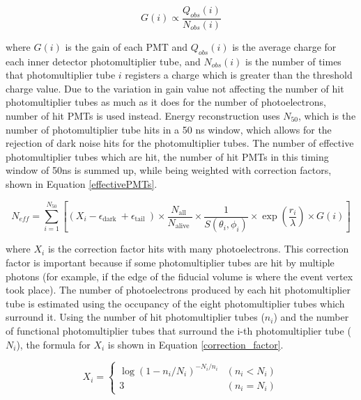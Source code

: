 \begin{equation}
    G(i) \propto \frac{Q_{o b s}(i)}{N_{o b s}(i)}
\label{gain_equation}
\end{equation}

where $G(i)$ is the gain of each PMT and $Q_{obs}(i)$ is the average charge for each inner detector photomultiplier tube, and $N_{obs}(i)$ is the number of times that photomultiplier tube $i$ registers a charge which is greater than the threshold charge value. Due to the variation in gain value not affecting the number of hit photomultiplier tubes as much as it does for the number of photoelectrons, number of hit PMTs is used instead. Energy reconstruction uses $N_{50}$, which is the number of photomultiplier tube hits in a 50 ns window, which allows for the rejection of dark noise hits for the photomultiplier tubes. The number of effective photomultiplier tubes which are hit, the number of hit PMTs in this timing window of 50ns is summed up, while being weighted with correction factors, shown in Equation \ref{effectivePMTs}. 

\begin{equation}
    N_{e f f}=\sum_{i=1}^{N_{50}}\left[\left(X_{i}-\epsilon_{\text {dark }}+\epsilon_{\text {tail }}\right) \times \frac{N_{\text {all }}}{N_{\text {alive }}} \times \frac{1}{S\left(\theta_{i}, \phi_{i}\right)} \times \exp \left(\frac{r_{i}}{\lambda}\right) \times G(i)\right]
    \label{neff}
\end{equation}

where $X_{i}$ is the correction factor hits with many photoelectrons. This correction factor is important because if some photomultiplier tubes are hit by multiple photons (for example, if the edge of the fiducial volume is where the event vertex took place). The number of photoelectrons produced by each hit photomultiplier tube is estimated using the occupancy of the eight photomultiplier tubes which surround it. Using the number of hit photomultiplier tubes ($n_{i}$) and the number of functional photomultiplier tubes that surround the i-th photomultiplier tube ($N_{i}$), the formula for $X_{i}$ is shown in Equation \ref{correction_factor}.

\begin{equation}
    X_{i}=\left\{\begin{array}{ll}
        \log \left(1-n_{i} / N_{i}\right)^{-N_{i} / n_{i}} & \left(n_{i}<N_{i}\right) \\
        3 & \left(n_{i}=N_{i}\right)
        \end{array}\right.
        \label{correction_factor}
\end{equation}


